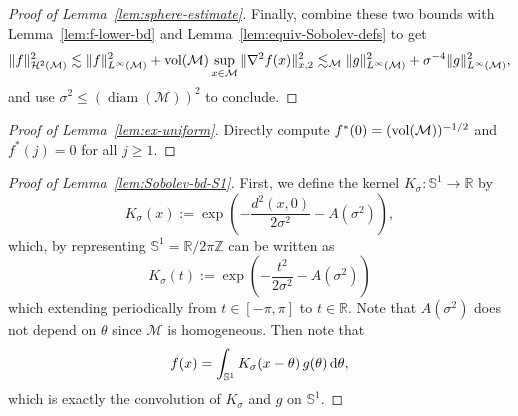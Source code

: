 \documentclass[preprint]{imsart}
\theoremstyle{plain}
\theoremstyle{definition}
\newcommand{\Rbb}{\mathbb{R}}
\newcommand{\Zbb}{\mathbb{Z}}
\newcommand{\Mcal}{\mathcal{M}}
\newcommand{\Hcal}{\mathcal{H}}
\newcommand{\diff}{\textnormal{d}}
\newcommand{\vol}{\textnormal{vol}}
\DeclareMathOperator{\diam}{diam}
\begin{document}
\begin{appendix}
\begin{proof}[Proof of Lemma~\ref{lem:sphere-estimate}]
    Finally, combine these two bounds with Lemma~\ref{lem:f-lower-bd} and Lemma~\ref{lem:equiv-Sobolev-defs} to get
    \begin{equation*}
        \|f\|_{\Hcal^2(\Mcal)}^2 \lesssim \|f\|^2_{L^{\infty}(\Mcal)} + \vol(\Mcal)\sup_{x\in\Mcal}\|\nabla^2f(x)\|^2_{x,2} \lesssim_{\Mcal} \|g\|^2_{L^{\infty}(\Mcal)} +\sigma^{-4}\|g\|^2_{L^{\infty}(\Mcal)},
    \end{equation*}
    and use $\sigma^2\le (\diam(\Mcal))^2$ to conclude.
\end{proof}


\begin{proof}[Proof of Lemma~\ref{lem:ex-uniform}]
    Directly compute $f^{\ast}(0) = (\vol(\Mcal))^{-1/2}$ and $f^{\ast}(j) = 0$ for all $j\ge 1$.
\end{proof}

\begin{proof}[Proof of Lemma~\ref{lem:Sobolev-bd-S1}]
First, we define the kernel $K_\sigma:\mathbb{S}^1\to\Rbb$ by
\begin{equation*}
    K_\sigma(x):=
\exp\left(
    -\frac{d^2(x,0)}{2\sigma^2}
    -A(\sigma^2)
\right),
\end{equation*}
which, by representing $\mathbb{S}^1=\Rbb/2\pi\Zbb$ can be written as
\[
K_\sigma(t):=\exp\left(-\frac{t^2}{2\sigma^2}-A(\sigma^2)\right)
\]
which extending periodically from $t\in[-\pi,\pi]$ to $t\in\Rbb$.
Note that $A(\sigma^2)$ does not depend on $\theta$ since $\Mcal$ is homogeneous.
Then note that
\[
f(x)=\int_{\mathbb{S}^1}K_\sigma(x-\theta)\,g(\theta)\,\diff\theta,
\]
which is exactly the convolution of $K_\sigma$ and $g$ on $\mathbb{S}^1$.


\end{proof}
\end{appendix}
\end{document}
